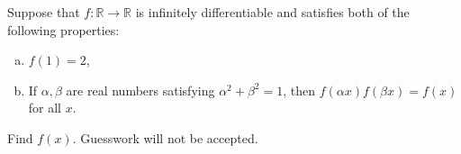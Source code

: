 Suppose that $f : \mathbb{R} \to \mathbb{R}$ is infinitely differentiable and
satisfies both of the following properties:

\begin{enumerate}[(a)]

\item $f(1) = 2$,
\item If $\alpha, \beta$ are real numbers satisfying $\alpha^2 + \beta^2 = 1$,
      then $f(\alpha x) f(\beta x) = f(x)$ for all $x$.

\end{enumerate}

Find $f(x)$. Guesswork will not be accepted.
